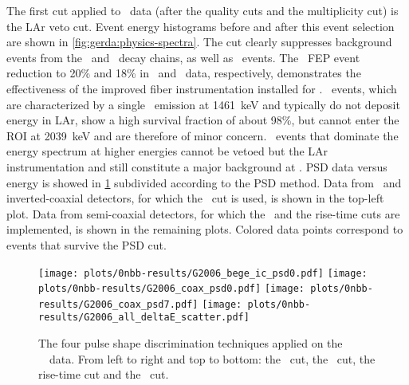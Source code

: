 The first cut applied to \phasetwo\ data (after the quality cuts and the multiplicity cut)
is the LAr veto cut.  Event energy histograms before and after this event selection are
shown in \cref{fig:gerda:physics-spectra}. The cut clearly suppresses background events from
the \Th\ and \Uh\ decay chains, as well as \kvz\ events. The \kvz\ FEP event reduction to
20\% and 18\% in \phasetwo\ and \phasetwop\ data, respectively, demonstrates the
effectiveness of the improved fiber instrumentation installed for \phasetwop. \kvn\
events, which are characterized by a single \g\ emission at 1461~keV and typically do not
deposit energy in LAr, show a high survival fraction of about 98\%, but cannot enter the
ROI at 2039~keV and are therefore of minor concern. \a\ events that dominate the energy
spectrum at higher energies cannot be vetoed but the LAr instrumentation and still
constitute a major background at \qbb.
\newpar
PSD data versus energy is showed in \cref{fig:gerda:psd-on-data} subdivided according to
the PSD method. Data from \bege\ and inverted-coaxial detectors, for which the \aoe\ cut
is used, is shown in the top-left plot. Data from semi-coaxial detectors, for which the
\annmse\ and the rise-time cuts are implemented, is shown in the remaining plots. Colored
data points correspond to events that survive the PSD cut.

\begin{figure}
  \centering
  \texttt{[image: plots/0nbb-results/G2006\_bege\_ic\_psd0.pdf]}%
  \texttt{[image: plots/0nbb-results/G2006\_coax\_psd0.pdf]}
  \texttt{[image: plots/0nbb-results/G2006\_coax\_psd7.pdf]}%
  \texttt{[image: plots/0nbb-results/G2006\_all\_deltaE\_scatter.pdf]}
  \caption{%
    The four pulse shape discrimination techniques applied on the \gerda\ \phasetwo\
    data. From left to right and top to bottom: the \aoe\ cut, the \annmse\ cut, the
    rise-time cut and the \deltae\ cut. \fillme{to be updated with final plots}
  }\label{fig:gerda:psd-on-data}
\end{figure}

